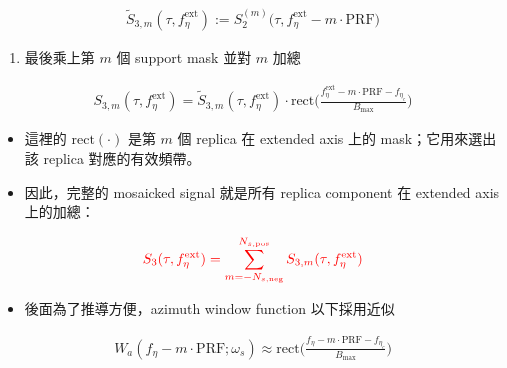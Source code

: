 \documentclass[11pt]{article}
\providecommand{\tightlist}{%
  \setlength{\itemsep}{0pt}\setlength{\parskip}{0pt}}
\begin{document}
\begin{equation}
\begin{aligned}
\widetilde S_{3,m}(\tau,f_\eta^{\mathrm{ext}})
:= S_2^{(m)}\biggl(\tau,f_\eta^{\mathrm{ext}}-m\cdot\mathrm{PRF}\biggr)
\end{aligned}
\end{equation}

\begin{enumerate}
\def\labelenumi{\arabic{enumi})}
\setcounter{enumi}{2}
\tightlist
\item
  最後乘上第 \(m\) 個 support mask 並對 \(m\) 加總
\end{enumerate}

\begin{equation}
\begin{aligned}
S_{3,m}(\tau,f_\eta^{\mathrm{ext}})
= \widetilde S_{3,m}(\tau,f_\eta^{\mathrm{ext}})\cdot
\mathrm{rect}\biggl(\frac{f_\eta^{\mathrm{ext}}-m\cdot\mathrm{PRF}-f_{\eta_c}}{B_{\max}}\biggr)
\end{aligned}
\end{equation}

\begin{itemize}
\item
  這裡的 \(\mathrm{rect}(\cdot)\) 是第 \(m\) 個 replica 在 extended axis
  上的 mask；它用來選出該 replica 對應的有效頻帶。
\item
  因此，完整的 mosaicked signal 就是所有 replica component 在 extended
  axis 上的加總：
\end{itemize}

\begin{equation}
\begin{aligned}
{\color{red}{S_3(\tau,f_\eta^{\mathrm{ext}})=\sum_{m=-N_{s,\mathrm{neg}}}^{N_{s,\mathrm{pos}}}S_{3,m}(\tau,f_\eta^{\mathrm{ext}})}}
\end{aligned}
\end{equation}

\begin{itemize}
\tightlist
\item
  後面為了推導方便，azimuth window function 以下採用近似
\end{itemize}

\begin{equation}
\begin{aligned}
W_a(f_\eta-m\cdot\mathrm{PRF};\omega_s)\approx
\mathrm{rect}\biggl(\frac{f_\eta-m\cdot\mathrm{PRF}-f_{\eta_c}}{B_{\max}}\biggr)
\end{aligned}
\end{equation}
\end{document}
